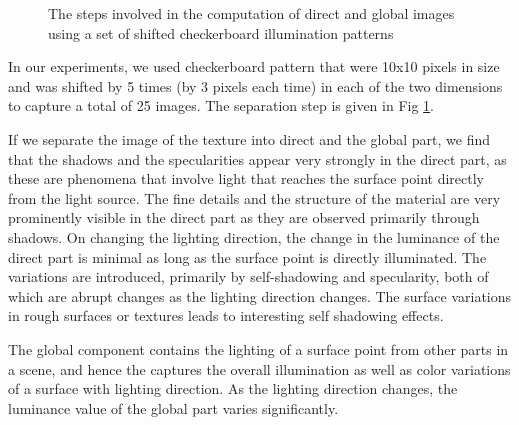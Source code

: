 \begin{figure}[t]
\centering
{}
\caption{The steps involved in the computation of direct and
global images using a set of shifted checkerboard illumination patterns}\label{fig:16}
\end{figure}

In our experiments, we used checkerboard pattern that were 10x10 pixels in
size and was shifted by 5 times (by 3 pixels each time) in each of
the two dimensions to capture a total of 25 images. The separation
step is given in Fig \ref{fig:16}.

If we separate the image of the texture into direct and the global part, we find
that the shadows and the specularities appear very strongly in the direct part,
as these are phenomena that involve light that reaches the surface point
directly from the light source. The fine details and the structure of the
material are very prominently visible in the direct part as they are observed
primarily through shadows. On changing the lighting direction, the change in the
luminance of the direct part is minimal as long as the surface point is directly
illuminated. The variations are introduced, primarily by self-shadowing and
specularity, both of which are abrupt changes as the lighting direction changes.
The surface variations in rough surfaces or textures leads to interesting 
self shadowing effects.

The global component contains the lighting of a surface point from other
parts in a scene, and hence the captures the overall illumination as well as
color variations of a surface with lighting direction. As the lighting direction
changes, the luminance value of the global part varies significantly.

